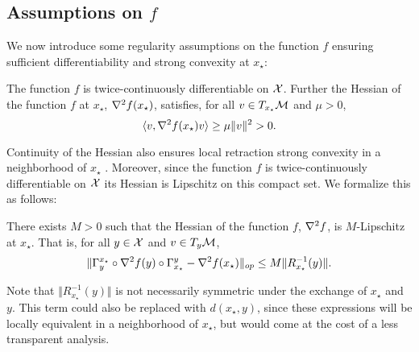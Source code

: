 \subsection{Assumptions on $f$}
\vspace{-.0856cm}
We now introduce some regularity assumptions on the function $f$ ensuring
sufficient differentiability and strong convexity at $x_\star$:
\begin{assumption} \label{assump:strongconvpoint}
The function $f$ is twice-continuously differentiable on $\mathcal{X}$. Further
the Hessian of the function $f$ at $x_\star$, $\nabla^2 f(x_\star)$, satisfies,
for all $v \in T_{x_\star}\mathcal{M}$ and $\mu>0$,
\[
\langle v, \nabla^2 f(x_\star)v\rangle \geq \mu \Vert v\Vert^2>0.
\]
\end{assumption}
Continuity of the Hessian  also ensures local retraction strong convexity in a neighborhood of $x_\star$ \citep[][Prop. 5.5.6]{absil2009optimization}. Moreover, since the function $f$ is twice-continuously differentiable on $\mathcal{X}$ its Hessian is Lipschitz on this compact set.
We formalize this as follows:
\begin{assumption}  \label{assump:HessianLip}
 There exists $M>0$ such that the Hessian of the function $f$, $\nabla^2 f$, is $M$-Lipschitz  at $x_\star$.
That is, for all $y \in \mathcal{X}$ and $v \in T_{y}\mathcal{M}$,
\[
\Vert \Gamma_{y}^{x_\star}  \circ \nabla^2 f(y) \circ \Gamma_{x_\star}^{y} -  \nabla^2 f(x_\star)\Vert_{op} \leq M \Vert R_{x_\star}^{-1}(y) \Vert.
\]
\end{assumption}
Note that $\Vert R_{x_\star}^{-1}(y) \Vert$ is not necessarily symmetric under the exchange of $x_\star$ and $y$. This term could also be replaced with $d(x_\star, y)$, since these expressions will be locally equivalent
in a neighborhood of $x_\star$, but would come at the cost of a less transparent analysis.
\vspace{-0.11pt}
